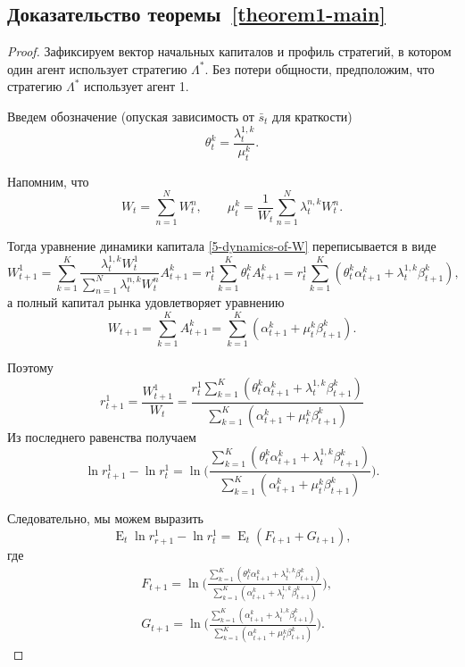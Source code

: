 \documentclass[a4paper,12pt,russian]{article} %
\theoremstyle{definition}
\DeclareMathOperator{\E}{E}
\begin{document}
\subsection{Доказательство теоремы~\ref{theorem1-main}}

\begin{proof}
Зафиксируем вектор начальных капиталов и профиль стратегий, в котором один агент использует стратегию $\Lambda^*$.
Без потери общности, предположим, что стратегию $\Lambda^*$ использует агент 1. 

Введем обозначение (опуская зависимость от $\bar s_t$ для краткости) 
\[
\theta_{t}^k = \frac{\lambda_{t}^{1,k}}{\mu_{t}^k}.
\]

Напомним, что 
\[
W_t = \sum_{n=1}^N W_t^n, \qquad
\mu_{t}^k = \frac{1}{W_t}\sum_{n=1}^{N}\lambda_{t}^{n,k} W_t^n.
\]

Тогда уравнение динамики капитала \eqref{5-dynamics-of-W} переписывается в виде
\[
W_{t+1}^1 = 
\sum_{k=1}^K \frac{\lambda_{t}^{1,k} W_t^1}{\sum_{n=1}^N \lambda_{t}^{n,k} W_t^n} A_{t+1}^k
=r_t^1 \sum_{k=1}^K \theta_{t}^k A_{t+1}^k 
= r_t^1\sum_{k=1}^K (\theta_{t}^k \alpha_{t+1}^k + \lambda_{t}^{1,k}\beta_{t+1}^k), 
\]
а полный капитал рынка удовлетворяет уравнению 
\[
W_{t+1} = \sum_{k=1}^K A_{t+1}^k 
= \sum_{k=1}^K (\alpha_{t+1}^k + \mu_{t}^k \beta_{t+1}^k).
\]

Поэтому 
\[
r_{t+1}^1 = \frac {W_{t+1}^1}{W_t}= \frac{r_t^1\sum_{k=1}^K (\theta_{t}^k \alpha_{t+1}^k + \lambda_{t}^{1,k}\beta_{t+1}^k)}{\sum_{k=1}^K (\alpha_{t+1}^k + \mu_{t}^k \beta_{t+1}^k)}
\]
Из последнего равенства получаем 
\begin{equation}
\label{25-log-r}
\ln r_{t+1}^1 - \ln r_t^1 
= \ln\Biggl(
  \frac{\sum_{k=1}^K (\theta_{t}^k \alpha_{t+1}^k + \lambda_{t}^{1,k}\beta_{t+1}^k)}
       {\sum_{k=1}^K (\alpha_{t+1}^k + \mu_{t}^k \beta_{t+1}^k)}
  \Biggr).
\end{equation}

Следовательно, мы можем выразить
\[
\E_t \ln r_{r+1}^1 - \ln r_t^1 = \E_t(F_{t+1} + G_{t+1}), 
\]
где
\begin{align}
\label{26-F}
&F_{t+1} = \ln \biggl(
  \frac{\sum_{k=1}^K (\theta_{t}^k\alpha_{t+1}^k + \lambda_{t}^{1,k}\beta_{t+1}^k)}
       {\sum_{k=1}^K (\alpha_{t+1}^k + \lambda_{t}^{1,k}\beta_{t+1}^k)}
  \biggr),\\
\label{27-G}
&G_{t+1} = \ln\biggl(
  \frac{\sum_{k=1}^K (\alpha_{t+1}^k + \lambda_{t}^{1,k} \beta_{t+1}^k)}
       {\sum_{k=1}^K (\alpha_{t+1}^k + \mu_{t}^k \beta_{t+1}^k)}
  \biggr).
\end{align}


\end{proof}
\end{document}
